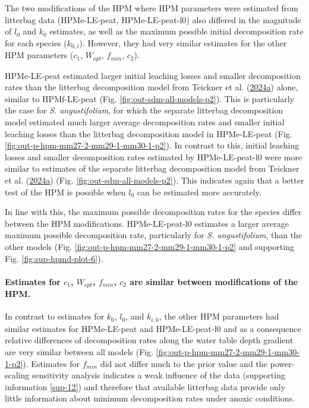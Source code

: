 \documentclass[
  12pt,
]{article}
\begin{document}
The two modifications of the HPM where HPM parameters were estimated from litterbag data (HPMe-LE-peat, HPMe-LE-peat-l0) also differed in the magnitude of \(l_0\) and \(k_0\) estimates, as well as the maximum possible initial decomposition rate for each species (\(k_{0,i}\)). However, they had very similar estimates for the other HPM parameters (\(c_1\), \(W_{opt}\), \(f_{min}\), \(c_2\)).

HPMe-LE-peat estimated larger initial leaching losses and smaller decomposition rates than the litterbag decomposition model from Teickner et al. (\protect\hyperlink{ref-Teickner.2024}{2024a}) alone, similar to HPMf-LE-peat (Fig. \ref{fig:out-sdm-all-models-p2}). This is particularly the case for \emph{S. angustifolium}, for which the separate litterbag decomposition model estimated much larger average decomposition rates and smaller initial leaching losses than the litterbag decomposition model in HPMe-LE-peat (Fig. \ref{fig:out-p-hpm-mm27-2-mm29-1-mm30-1-p2}). In contrast to this, initial leaching losses and smaller decomposition rates estimated by HPMe-LE-peat-l0 were more similar to estimates of the separate litterbag decomposition model from Teickner et al. (\protect\hyperlink{ref-Teickner.2024}{2024a}) (Fig. \ref{fig:out-sdm-all-models-p2}). This indicates again that a better test of the HPM is possible when \(l_0\) can be estimated more accurately.

In line with this, the maximum possible decomposition rates for the species differ between the HPM modifications. HPMe-LE-peat-l0 estimates a larger average maximum possible decomposition rate, particularly for \emph{S. angustifolium}, than the other models (Fig. \ref{fig:out-p-hpm-mm27-2-mm29-1-mm30-1-p2} and supporting Fig. \ref{fig:sup-hpmd-plot-6}).

\hypertarget{estimates-for-c_1-w_opt-f_min-c_2-are-similar-between-modifications-of-the-hpm.}{%
\paragraph*{\texorpdfstring{Estimates for \(c_1\), \(W_{opt}\), \(f_{min}\), \(c_2\) are similar between modifications of the HPM.}{Estimates for c\_1, W\_\{opt\}, f\_\{min\}, c\_2 are similar between modifications of the HPM.}}\label{estimates-for-c_1-w_opt-f_min-c_2-are-similar-between-modifications-of-the-hpm.}}

In contrast to estimates for \(k_0\), \(l_0\), and \(k_{i,0}\), the other HPM parameters had similar estimates for HPMe-LE-peat and HPMe-LE-peat-l0 and as a consequence relative differences of decomposition rates along the water table depth gradient are very similar between all models (Fig. \ref{fig:out-p-hpm-mm27-2-mm29-1-mm30-1-p2}). Estimates for \(f_{min}\) did not differ much to the prior value and the power-scaling sensitivity analysis indicates a weak influence of the data (supporting information \ref{sup-12}) and therefore that available litterbag data provide only little information about minimum decomposition rates under anoxic conditions.
\end{document}
